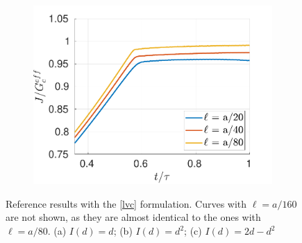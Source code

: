 \begin{figure}[h]
\begin{subfigure}{.33\textwidth}
  \includegraphics[width=\linewidth]{images/2d_propagation/zoom_bourdin_I_2d.pdf}
  \caption{}
  \label{fig:prop_bourdin_2d}
\end{subfigure}
  \caption{Reference results with the \ref{lvc} formulation. Curves with $\ell = a/160$ are not shown, as they are almost identical to the ones with $\ell = a/80$. (a) $I(d) = d$; (b) $I(d) = d^2$; (c) $I(d) = 2d-d^2$  } 
  \label{fig:prop_bourdin}
\end{figure}

